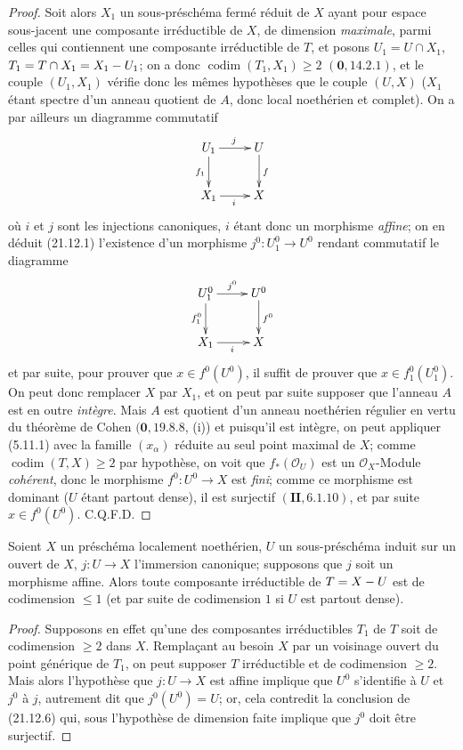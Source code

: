 \begin{proof}
Soit alors $X_1$ un sous-préschéma fermé réduit de $X$ ayant pour espace sous-jacent
une composante irréductible de $X$, de dimension \emph{maximale}, parmi celles qui
contiennent une composante irréductible de $T$, et posons
$U_1=U\cap X_1$, $T_1=T\cap X_1=X_1- U_1$; on a donc
$\operatorname{codim}(T_1,X_1)\geq2$ $(\mathbf 0, 14.2.1)$, et le couple $(U_1,X_1)$
vérifie donc les mêmes hypothèses que le couple $(U,X)$ ($X_1$ étant spectre d'un
anneau quotient de $A$, donc local noethérien et complet). On a par ailleurs un
diagramme commutatif
\[
  \xymatrix{
    U_1 \ar[r]^j \ar[d]_{f_1} & U \ar[d]^f \\
    X_1 \ar[r]_i & X
  }
\]
où $i$ et $j$ sont les injections canoniques, $i$ étant donc un morphisme \emph{affine}; on en
déduit (21.12.1) l'existence d'un morphisme $j^0:U_1^0\to U^0$ rendant commutatif le
diagramme
\[
  \xymatrix{
    U_1^0 \ar[r]^{j^0} \ar[d]_{f_1^0} & U^0 \ar[d]^{f^0} \\
    X_1 \ar[r]_i & X
  }
\]
et par suite, pour prouver que $x\in f^0(U^0)$, il suffit de prouver que
$x\in f_1^0(U_1^0)$. On peut donc remplacer $X$ par $X_1$, et on peut par suite
supposer que l'anneau $A$ est en outre \emph{intègre}. Mais $A$ est quotient d'un
anneau noethérien régulier en vertu du théorème de Cohen $(\mathbf 0, 19.8.8$, (i)) et
puisqu'il est intègre, on peut appliquer (5.11.1) avec la famille $(x_\alpha)$ réduite au
seul point maximal de $X$; comme $\operatorname{codim}(T,X)\geq2$ par hypothèse, on
voit que $f_*(\mathcal O_U)$ est un $\mathcal O_X$-Module \emph{cohérent}, donc le
morphisme $f^0:U^0\to X$ est \emph{fini}; comme ce morphisme est dominant ($U$ étant partout
dense), il est surjectif $(\mathbf{II}, 6.1.10)$, et par suite $x\in f^0(U^0)$. C.Q.F.D.
\end{proof}

\begin{corollary}[21.12.7]
\label{IV.21.12.7}
Soient $X$ un préschéma localement noethérien, $U$ un sous-préschéma induit sur un
ouvert de $X$, $j:U\to X$ l'immersion canonique; supposons que $j$ soit un morphisme
\textup{affine}. Alors toute composante irréductible de $T=X- U$ est de codimension $\leq1$
(et par suite de codimension $1$ si $U$ est partout dense).
\end{corollary}

\begin{proof}
Supposons en effet qu'une des composantes irréductibles $T_1$ de $T$ soit de
codimension $\geq2$ dans $X$. Remplaçant au besoin $X$ par un voisinage ouvert du
point générique de $T_1$, on peut supposer $T$ irréductible et de codimension $\geq2$.
Mais alors l'hypothèse
que $j:U\to X$ est affine implique que $U^0$ s'identifie à $U$ et $j^0$ à $j$,
autrement dit que $j^0(U^0)=U$; or, cela contredit la conclusion de (21.12.6) qui,
sous l'hypothèse de dimension faite implique que $j^0$ doit être surjectif.
\end{proof}

